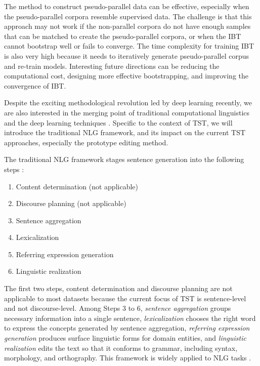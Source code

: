 The method to construct pseudo-parallel data can be effective, especially when the pseudo-parallel corpora resemble supervised data. The challenge is that this approach may not work if the non-parallel corpora do not have enough samples that can be matched to create the pseudo-parallel corpora, or when the IBT cannot bootstrap well or fails to converge. The time complexity for training IBT is also very high because it needs to iteratively generate pseudo-parallel corpus and re-train models. Interesting future directions can be reducing the computational cost, designing more effective bootstrapping, and improving the convergence of IBT.

Despite the exciting methodological revolution led by deep learning recently, we are also interested in the merging point of traditional computational linguistics and the deep learning techniques . Specific to the context of TST, we will introduce the traditional NLG framework, and its impact on the current TST approaches, especially the prototype editing method.

The traditional NLG framework stages sentence generation into the following steps :
\begin{enumerate}[nolistsep]
\item Content determination (not applicable)
\item Discourse planning (not applicable)
\item Sentence aggregation
\item Lexicalization
\item Referring expression generation
\item Linguistic realization
\end{enumerate}
The first two steps, content determination and discourse planning are not applicable to most datasets because the current focus of TST is sentence-level and not discourse-level.
Among  Steps 3 to 6, 
\textit{sentence aggregation} groups necessary information into a single sentence, \textit{lexicalization} chooses the right word to express the concepts generated by sentence aggregation, \textit{referring expression generation} produces surface linguistic forms for domain entities,
and \textit{linguistic realization} edits the text so that it conforms to grammar, including syntax, morphology, and orthography. This framework is widely applied to NLG tasks \cite[e.g.,][]{zue2000conversational,mani2001automatic,mctear2002spoken,gatt2009simplenlg,androutsopoulos2010survey}.


